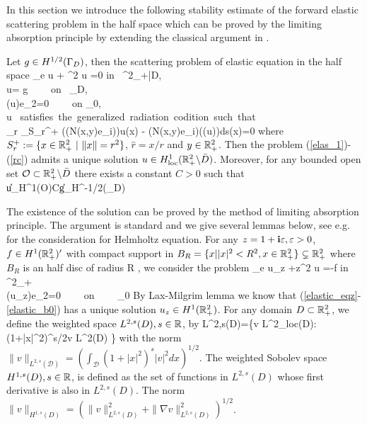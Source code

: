 \documentclass[12pt]{iopart}
\begin{document}
In this section we introduce the following stability estimate of the forward elastic scattering problem in the half space which can be proved by the limiting absorption principle by extending the classical argument in \cite{leis,wilcox1975,Yves1988}.
\begin{thm} \label{elastic_eq2}
	Let $g \in H^{1/2}(\Gamma_D)$, then the scattering problem of elastic equation in the half space
	\be
	\Delta_e u + \omega^2 u =0 \qquad\mbox{\rm in } \R^2_+\bks \bar{D}, \label{elas_1}\ \ \
	\\ u= g \ \ \ \ \mbox{\rm on } \Ga_D, \label{elas_bd} \\
	\sigma(u)e_2=0 \ \ \ \ \mbox{\rm on} \Ga_0, \label{elas_b0} \\
	u \ \mbox{satisfies the generalized radiation codition\cite{Guzina2006} such that} \nn \\\label{rc}
	\lim_{r\to\infty}  \int_{S_r^+} (\sigma(N(x,y)e_i))\cdot u(x) - (N(x,y)e_i)\cdot (\sigma(u)\hat{r})ds(x)=0
	\ee
	where $S_r^+:=\{x\in {\mathbb{R}}^2_+ \ | \ \|x\|=r^2\}$, $\hat{r}=x/r$ and $y\in {\mathbb{R}}_+^2$. Then the problem (\ref{elas_1})-(\ref{rc})
	admits a unique solution $u \in H^{1}_{\rm loc}({\mathbb{R}}^2_+ \backslash \bar D)$. Moreover, for any bounded open set $\mathcal O\subset {\mathbb{R}}^2_+\backslash\bar D$ there exists a constant $C>0$ such that
	\be \label{elas_ineq}
	\|u\|_{H^{1}(\mathcal O)}\le C\|g\|_{H^{-1/2}(\Ga_D)}
	\ee
\end{thm}
The existence of the solution can be proved by the method of limiting absorption principle. The argument is standard and we give several lemmas below, see e.g. \cite{leis} for the consideration for Helmholtz equation. For any $z=1+\mathbf{i}\varepsilon,\varepsilon>0$, $f\in H^{1}({\mathbb{R}}^2_+)'$ with compact support in $B_R=\{x||x|^2<R^2,x\in{\mathbb{R}}^2_+\}\subsetneq{\mathbb{R}}_+^2$ where $B_R$ is an half disc of radius R , we consider the problem
\be \label{elastic_eqz}
\Delta_e u_z +z\omega^2 u =-f \qquad\mbox{\rm in } \R^2_+ \\
\sigma(u_z)e_2=0 \ \ \ \ \mbox{\rm on} \ \ \ \  \Ga_0 \label{elastic_b0}
\ee
By Lax-Milgrim lemma we know that (\ref{elastic_eqz}-\ref{elastic_b0}) has a unique solution $u_z\in H^1({\mathbb{R}}^2_+)$. For any domain $ D \subset {\mathbb{R}}^2_+$, we define the weighted space $L^{2,s}(D),s \in {\mathbb{R}}$, by
\ben
L^{2,s}(D)=\{v \in L^2_{\rm loc}(D): (1+|x|^2)^{s/2}v \in L^2(D) \}
\een
with the norm $\| v \|_{ L^{2,s}(\mathcal D)} = (\int_{\mathcal D}(1+|x|^2)^{s}|v|^2 dx )^{1/2}$. The weighted Sobolev space $H^{1,s}(D),s \in {\mathbb{R}}$,
is defined as the set of functions in $L^{2,s}(D)$ whose first derivative is also in $L^{2,s}(D)$. The norm
$\| v \|_{ H^{1,s}(D)} = (\| v \|^2_{ L^{2,s} (D)} + \| \nabla v \|^2_{ L^{2,s}(D)})^{1/2}$.
\end{document}

